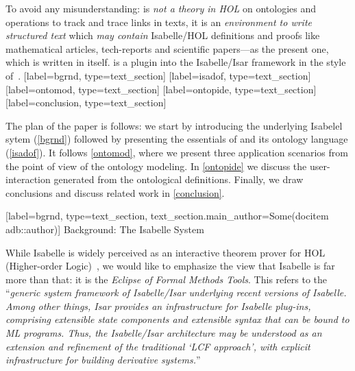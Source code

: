 \begin{isabellebody}
{To avoid any misunderstanding: \isadof  is \emph{not a theory in HOL}  
on ontologies and operations to track and trace links in texts,
it is an \emph{environment to write structured text} which \emph{may contain} 
Isabelle/HOL definitions and proofs like mathematical articles, tech-reports and
scientific papers---as the present one, which is written in \isadof 
itself. \isadof is a plugin into the Isabelle/Isar
framework in the style of~\cite{wenzel.ea:building:2007}.}%
%
\isaDofDeclareReferenceTextSection%
%
[label={bgrnd}, type={text_section}]%
%
%
\isaDofDeclareReferenceTextSection%
%
[label={isadof}, type={text_section}]%
%
%
\isaDofDeclareReferenceTextSection%
%
[label={ontomod}, type={text_section}]%
%
%
\isaDofDeclareReferenceTextSection%
%
[label={ontopide}, type={text_section}]%
%
%
\isaDofDeclareReferenceTextSection%
%
[label={conclusion}, type={text_section}]%
%
\begin{isamarkuptext}%
The plan of the paper is follows: we start by introducing  the underlying 
Isabelel sytem (\autoref{bgrnd}) followed by presenting the 
essentials of  \isadof and its ontology language (\autoref{isadof}). 
It follows \autoref{ontomod}, where we present three application 
scenarios from the point of view of the ontology modeling. In \autoref{ontopide}
we discuss the user-interaction generated from the ontological definitions.  Finally, we draw 
conclusions  and discuss related work in \autoref{conclusion}.%
\end{isamarkuptext}\isamarkuptrue%
%
%
\isaDofSectionTextSection%
%
[label={bgrnd}, type={text_section},
         text_section.main_author={Some({\isacharat}{docitem adb}::author)}]%
{Background: The Isabelle System}%
%
\begin{isamarkuptext}%
While Isabelle is widely perceived as an interactive theorem prover
for HOL (Higher-order Logic)~\cite{nipkow.ea:isabelle:2002}, we
would like to emphasize the view that Isabelle is far more than that:
it is the \emph{Eclipse of Formal Methods Tools}.  This refers to the
``\textsl{generic system framework of Isabelle/Isar underlying recent
  versions of Isabelle.  Among other things, Isar provides an
  infrastructure for Isabelle plug-ins, comprising extensible state
  components and extensible syntax that can be bound to ML
  programs. Thus, the Isabelle/Isar architecture may be understood as
  an extension and refinement of the traditional `LCF approach', with
  explicit infrastructure for building derivative
  \emph{systems}.}''~\cite{wenzel.ea:building:2007} 


\end{isamarkuptext}
\end{isabellebody}
